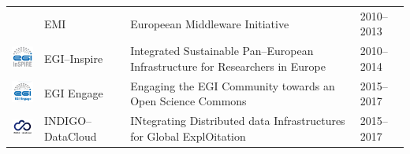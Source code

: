 \begin{table}[!h]
\begin{tabular}{p{1.6cm}p{2cm}p{5cm}l}
\begin{minipage}{.3\textwidth}
\end{minipage}
     & EMI &
Europeean Middleware Initiative & 2010--2013\\
\begin{minipage}{.3\textwidth}
\includegraphics[width=15mm,height=7.5mm]{images/egi-inspire}
\end{minipage}
     & EGI--Inspire &
Integrated Sustainable Pan--European Infrastructure for Researchers in Europe
 & 2010--2014\\
\begin{minipage}{.3\textwidth}
\includegraphics[width=15mm,height=7.5mm]{images/egi_engage}
\end{minipage}
     & EGI Engage &
Engaging the EGI Community towards an Open Science Commons
 & 2015--2017\\
\begin{minipage}{.3\textwidth}
\includegraphics[width=15mm,height=7.5mm]{images/indigo}
\end{minipage}
     & INDIGO--DataCloud &
INtegrating Distributed data Infrastructures for Global ExplOitation
 & 2015--2017\\
\hline
\hline
\end{tabular}
\end{table}


